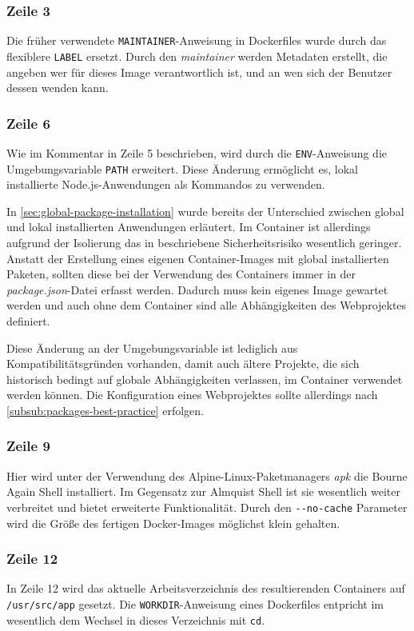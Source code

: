 \subsubsection{Zeile 3}
Die früher verwendete \verb|MAINTAINER|-Anweisung in Dockerfiles wurde durch das flexiblere \verb|LABEL| ersetzt.
Durch den \emph{maintainer} werden Metadaten erstellt, die angeben wer für dieses Image verantwortlich ist, und an wen sich der Benutzer dessen wenden kann.

\subsubsection{Zeile 6}
Wie im Kommentar in Zeile 5 beschrieben, wird durch die \verb|ENV|-Anweisung die Umgebungsvariable \verb|PATH| erweitert.
Diese Änderung ermöglicht es, lokal installierte Node.js-Anwendungen als Kommandos zu verwenden.

In \cref{sec:global-package-installation} wurde bereits der Unterschied zwischen global und lokal installierten Anwendungen erläutert.
Im Container ist allerdings aufgrund der Isolierung das in \autocite{stackoverflow:nodemodules-hack:online} beschriebene Sicherheitsrisiko wesentlich geringer.
Anstatt der Erstellung eines eigenen Container-Images mit global installierten Paketen, sollten diese bei der Verwendung des Containers immer in der \emph{package.json}-Datei erfasst werden.
Dadurch muss kein eigenes Image gewartet werden und auch ohne dem Container sind alle Abhängigkeiten des Webprojektes definiert.

Diese Änderung an der Umgebungsvariable ist lediglich aus Kompatibilitätsgründen vorhanden, damit auch ältere Projekte, die sich historisch bedingt auf globale Abhängigkeiten verlassen, im Container verwendet werden können.
Die Konfiguration eines Webprojektes sollte allerdings nach \cref{subsub:packages-best-practice} erfolgen.

\subsubsection{Zeile 9}
Hier wird unter der Verwendung des Alpine-Linux-Paketmanagers \emph{apk} die Bourne Again Shell installiert.
Im Gegensatz zur Almquist Shell ist sie wesentlich weiter verbreitet und bietet erweiterte Funktionalität.
Durch den \verb|--no-cache| Parameter wird die Größe des fertigen Docker-Images möglichst klein gehalten.

\subsubsection{Zeile 12}
In Zeile 12 wird das aktuelle Arbeitsverzeichnis des resultierenden Containers auf \verb|/usr/src/app| gesetzt.
Die \verb|WORKDIR|-Anweisung eines Dockerfiles entpricht im wesentlich dem Wechsel in dieses Verzeichnis mit \verb|cd|.

